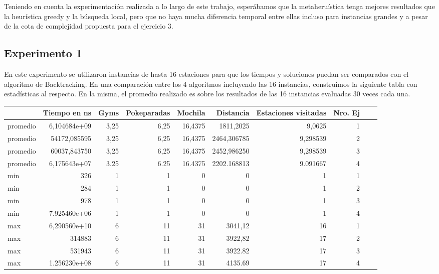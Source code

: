         Teniendo en cuenta la experimentación realizada a lo largo de este trabajo, esperábamos que la metaheruística tenga mejores resultados que la heurística greedy y la búsqueda local, pero que no haya mucha diferencia temporal entre ellas incluso para instancias grandes y a pesar de la cota de complejidad propuesta para el ejercicio 3.

    \subsection{Experimento 1}
        En este experimento se utilizaron instancias de hasta 16 estaciones para que los tiempos y soluciones puedan ser comparados con el algoritmo de Backtracking.
        En una comparación entre los 4 algoritmos incluyendo las 16 instancias, construimos la siguiente tabla con estadísticas al respecto. En la misma, el promedio realizado es sobre los resultados de las 16 instancias evaluadas 30 veces cada una.

\begin{flushleft}
\begin{tabular}{l | rrrrrrrrr}
\toprule
{} &       Tiempo en ns  &       Gyms &  Pokeparadas &     Mochila &    Distancia &  Estaciones visitadas &  Nro. Ej \\
\midrule
promedio  &  6,104684e+09 &   3,25     &    6,25     &   16,4375   &  1811,2025   &            9,0625   &      1 \\
promedio  &  54172,085595 &   3,25     &    6,25     &   16,4375   &  2464,306785 &            9,298539 &      2 \\
promedio  &  60037,843750 &   3,25     &    6,25     &   16,4375   &  2452,986250 &            9,298539 &      3 \\
promedio  &  6,175643e+07 &   3.25     &    6.25     &   16.4375   &  2202.168813 &            9.091667 &      4 \\
\hline
min   &  326          &   1        &    1        &   0         &  0           &            1        &      1 \\
min   &  284          &   1        &    1        &   0         &  0           &            1        &      2 \\
min   &  978          &   1        &    1        &   0         &  0           &            1        &      3 \\
min   &  7.925460e+06 &   1        &    1        &   0         &  0           &            1        &      4 \\
\hline
max   &  6,290560e+10 &   6        &    11       &   31        &  3041,12     &            16       &      1 \\
max   &  314883       &   6        &    11       &   31        &  3922,82     &            17       &      2 \\
max   &  531943       &   6        &    11       &   31        &  3922.82     &            17       &      3 \\
max   &  1.256230e+08 &   6        &    11       &   31        &  4135.69     &            17       &      4 \\
\bottomrule
\end{tabular}      
\end{flushleft}

